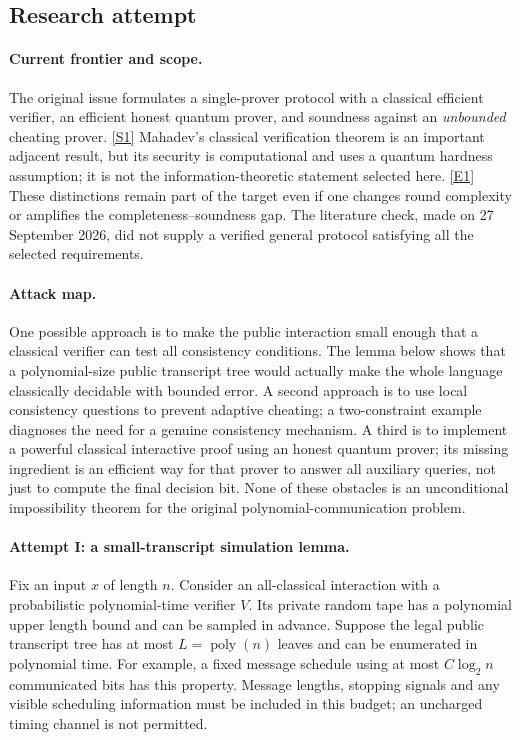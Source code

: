 \documentclass[11pt,a4paper]{article}
\newcommand{\sref}[2]{\hyperlink{source:#1:#2}{[S#2]}}
\newcommand{\eref}[2]{\hyperlink{extra:#1:#2}{[E#2]}}
\numberwithin{equation}{section}
\begin{document}
\subsection{Research attempt}

\paragraph{Current frontier and scope.}
The original issue formulates a single-prover protocol with a classical
efficient verifier, an efficient honest quantum prover, and soundness
against an \emph{unbounded} cheating prover. \sref{129}{1}
Mahadev's classical verification theorem is an important adjacent result,
but its security is computational and uses a quantum hardness assumption;
it is not the information-theoretic statement selected here.
\eref{129}{1}  These distinctions remain part of the target even if
one changes round complexity or amplifies the completeness--soundness
gap.  The literature check, made on 27 September 2026, did not supply
a verified general protocol satisfying all the selected requirements.

\paragraph{Attack map.}
One possible approach is to make the public interaction small enough
that a classical verifier can test all consistency conditions.  The
lemma below shows that a polynomial-size public transcript tree would
actually make the whole language classically decidable with bounded
error.  A second approach is to use local consistency questions to
prevent adaptive cheating; a two-constraint example diagnoses the
need for a genuine consistency mechanism.  A third is to implement a
powerful classical interactive proof using an honest quantum prover;
its missing ingredient is an efficient way for that prover to answer
all auxiliary queries, not just to compute the final decision bit.
None of these obstacles is an unconditional impossibility theorem for
the original polynomial-communication problem.

\paragraph{Attempt I: a small-transcript simulation lemma.}
Fix an input $x$ of length $n$.  Consider an all-classical interaction
with a probabilistic polynomial-time verifier $V$.  Its private random
tape has a polynomial upper length bound and can be sampled in advance.
Suppose the legal public transcript tree has at most $L=\operatorname{poly}(n)$
leaves and can be enumerated in polynomial time.  For example, a fixed
message schedule using at most $C\log_2 n$ communicated bits has this
property.  Message lengths, stopping signals and any visible scheduling
information must be included in this budget; an uncharged timing
channel is not permitted.
\end{document}
